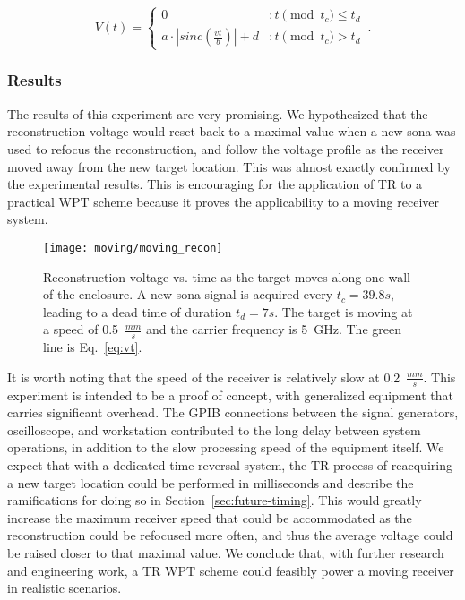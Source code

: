 \begin{equation}\label{eq:vt}
  V(t) = \left\{
        \begin{array}{ll}
                0 & : t\pmod{t_c} \le t_d \\
                a\cdot |sinc(\frac{\bar{v}t}{b})|+d & : t\pmod{t_c} > t_d
        \end{array}\,.
  \right.
\end{equation}

\subsubsection{Results}
\label{moving-results}

The results of this experiment are very promising. We hypothesized that the reconstruction \ptp{} voltage would reset back to a maximal value when a new sona was used to refocus the reconstruction, and follow the voltage profile as the receiver moved away from the new target location. This was almost exactly confirmed by the experimental results. This is encouraging for the application of TR to a practical WPT scheme because it proves the applicability to a moving receiver system.

\begin{figure}[t]
\centering
\texttt{[image: moving/moving\_recon]}
    \caption[\Ptp{} voltage of moving reconstructions]{Reconstruction \ptp{} voltage vs. time as the target moves along one wall of the enclosure. A new sona signal is acquired every $t_c = 39.8s$, leading to a dead time of duration $t_d = 7s$. The target is moving at a speed of 0.5~$\frac{mm}{s}$ and the carrier frequency is 5~GHz. The green line is Eq.~\ref{eq:vt}.}
    \label{fig:moving-recon}
\end{figure}

It is worth noting that the speed of the receiver is relatively slow at 0.2~$\frac{mm}{s}$. This experiment is intended to be a proof of concept, with generalized equipment that carries significant overhead. The GPIB connections between the signal generators, oscilloscope, and workstation contributed to the long delay between system operations, in addition to the slow processing speed of the equipment itself. We expect that with a dedicated time reversal system, the TR process of reacquiring a new target location could be performed in milliseconds and describe the ramifications for doing so in Section~\ref{sec:future-timing}. This would greatly increase the maximum receiver speed that could be accommodated as the reconstruction could be refocused more often, and thus the average \ptp{} voltage could be raised closer to that maximal value. We conclude that, with further research and engineering work, a TR WPT scheme could feasibly power a moving receiver in realistic scenarios.

